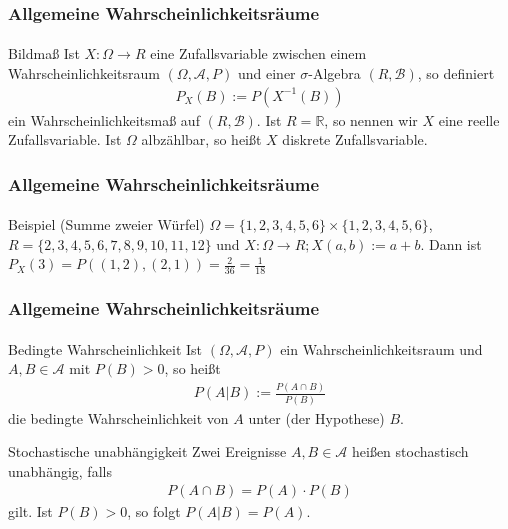 \documentclass{beamer}
\begin{document}
\begin{frame}
    \frametitle{Allgemeine Wahrscheinlichkeitsräume}
\framesubtitle{}
\begin{block}{Bildmaß}
Ist $X : \Omega \to R$  eine Zufallsvariable zwischen einem Wahrscheinlichkeitsraum  $(\Omega, \mathcal{A}, P)$  und einer $\sigma$-Algebra $(R,  \mathcal{B} )$, so definiert 
\begin{align*}
P_X(B) := P(X^{-1}(B))
\end{align*}
ein Wahrscheinlichkeitsmaß auf $(R, \mathcal{B})$. Ist  $R = \mathbb{R}$, so nennen wir  $X$ eine reelle Zufallsvariable. Ist $\Omega$ albzählbar, so heißt $X$ diskrete Zufallsvariable.
\end{block}

 \end{frame}

\begin{frame}
    \frametitle{Allgemeine Wahrscheinlichkeitsräume}
\framesubtitle{}
\begin{block}{Beispiel (Summe zweier Würfel)}
$\Omega = \{1,2,3,4,5,6 \} \times \{1,2,3,4,5,6 \} $, $R = \{ 2,3,4,5,6,7,8,9,10, 11, 12\}$ und $X: \Omega \to R; X (a,b) := a +b$. Dann ist 
$P_X(3) = P((1,2), (2,1)) = \frac{2}{36} = \frac{1}{18}$ 
\end{block}

 \end{frame}

\begin{frame}
    \frametitle{Allgemeine Wahrscheinlichkeitsräume}
\framesubtitle{}
\begin{block}{Bedingte Wahrscheinlichkeit}
Ist   $(\Omega, \mathcal{A}, P)$ ein Wahrscheinlichkeitsraum und $A,B \in \mathcal{A}$ mit $P(B)>0$, so heißt
\begin{align*}
P(A | B) := \frac{P(A \cap B)}{P(B)}
\end{align*}
die bedingte Wahrscheinlichkeit von $A$ unter (der Hypothese) $B$.
\end{block}
\begin{block}{Stochastische unabhängigkeit}
Zwei Ereignisse $A,B \in \mathcal{A}$ heißen stochastisch unabhängig, falls 
\begin{align*}
P(A \cap B) = P(A) \cdot P(B)
\end{align*}
gilt. Ist  $P(B)>0$, so folgt $P(A | B) = P(A)$.
\end{block}

 \end{frame}
\end{document}
